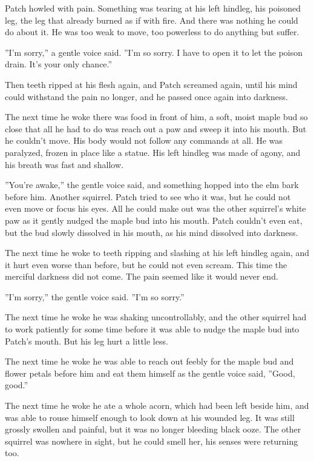 \documentclass[12pt]{book}
\begin{document}
 Patch howled with pain. Something was tearing at his left hindleg, his poisoned leg, the leg that already burned as if with fire. And there was nothing he could do about it. He was too weak to move, too powerless to do anything but suffer.\par
 ''I'm sorry,'' a gentle voice said. ''I'm so sorry. I have to open it to let the poison drain. It's your only chance.''\par
 Then teeth ripped at his flesh again, and Patch screamed again, until his mind could withstand the pain no longer, and he passed once again into darkness.\par
 The next time he woke there was food in front of him, a soft, moist maple bud so close that all he had to do was reach out a paw and sweep it into his mouth. But he couldn't move. His body would not follow any commands at all. He was paralyzed, frozen in place like a statue. His left hindleg was made of agony, and his breath was fast and shallow.\par
 ''You're awake,'' the gentle voice said, and something hopped into the elm bark before him. Another squirrel. Patch tried to see who it was, but he could not even move or focus his eyes. All he could make out was the other squirrel's white paw as it gently nudged the maple bud into his mouth. Patch couldn't even eat, but the bud slowly dissolved in his mouth, as his mind dissolved into darkness.\par
 The next time he woke to teeth ripping and slashing at his left hindleg again, and it hurt even worse than before, but he could not even scream. This time the merciful darkness did not come. The pain seemed like it would never end.\par
 ''I'm sorry,'' the gentle voice said. ''I'm so sorry.''\par
 The next time he woke he was shaking uncontrollably, and the other squirrel had to work patiently for some time before it was able to nudge the maple bud into Patch's mouth. But his leg hurt a little less.\par
 The next time he woke he was able to reach out feebly for the maple bud and flower petals before him and eat them himself as the gentle voice said, ''Good, good.''\par
 The next time he woke he ate a whole acorn, which had been left beside him, and was able to rouse himself enough to look down at his wounded leg. It was still grossly swollen and painful, but it was no longer bleeding black ooze. The other squirrel was nowhere in sight, but he could smell her, his senses were returning too.\par
\end{document}

